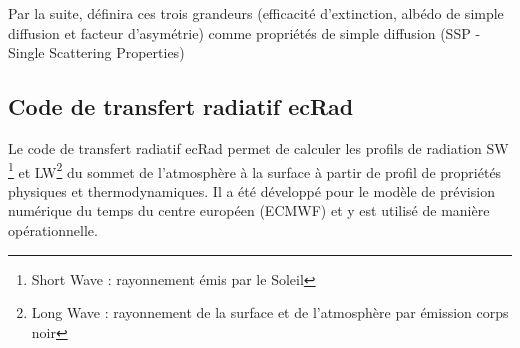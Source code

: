 Par la suite, définira ces trois grandeurs (efficacité d'extinction, albédo de simple diffusion et facteur d'asymétrie) comme propriétés de simple diffusion (SSP - Single Scattering Properties)

\subsection{Code de transfert radiatif ecRad}
\label{ss_ecRad}
Le code de transfert radiatif ecRad \citep{hogan_flexible_2018} permet de calculer les profils de radiation SW \footnote{Short Wave : rayonnement émis par le Soleil} et LW\footnote{Long Wave : rayonnement de la surface et de l'atmosphère par émission corps noir} du sommet de l'atmosphère à la surface à partir de profil de propriétés physiques et thermodynamiques. Il a été développé pour le modèle de prévision numérique du temps du centre européen (ECMWF) et y est utilisé de manière opérationnelle. 

